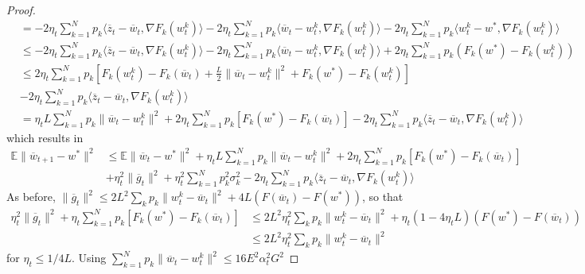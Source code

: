 \begin{proof}
\begin{align*}
	& =-2\eta_{t}\sum_{k=1}^{N}p_{k}\langle\overline{z}_{t}-\overline{w}_{t},\nabla F_{k}(w_{t}^{k})\rangle-2\eta_{t}\sum_{k=1}^{N}p_{k}\langle\overline{w}_{t}-w_{t}^{k},\nabla F_{k}(w_{t}^{k})\rangle-2\eta_{t}\sum_{k=1}^{N}p_{k}\langle w_{t}^{k}-w^{\ast},\nabla F_{k}(w_{t}^{k})\rangle\\
	& \leq-2\eta_{t}\sum_{k=1}^{N}p_{k}\langle\overline{z}_{t}-\overline{w}_{t},\nabla F_{k}(w_{t}^{k})\rangle-2\eta_{t}\sum_{k=1}^{N}p_{k}\langle\overline{w}_{t}-w_{t}^{k},\nabla F_{k}(w_{t}^{k})\rangle+2\eta_{t}\sum_{k=1}^{N}p_{k}(F_{k}(w^{\ast})-F_{k}(w_{t}^{k}))\\
	& \leq2\eta_{t}\sum_{k=1}^{N}p_{k}\left[F_{k}(w_{t}^{k})-F_{k}(\overline{w}_{t})+\frac{L}{2}\|\overline{w}_{t}-w_{t}^{k}\|^{2}+F_{k}(w^{\ast})-F_{k}(w_{t}^{k})\right]\\
	& -2\eta_{t}\sum_{k=1}^{N}p_{k}\langle\overline{z}_{t}-\overline{w}_{t},\nabla F_{k}(w_{t}^{k})\rangle\\
	& =\eta_{t}L\sum_{k=1}^{N}p_{k}\|\overline{w}_{t}-w_{t}^{k}\|^{2}+2\eta_{t}\sum_{k=1}^{N}p_{k}\left[F_{k}(w^{\ast})-F_{k}(\overline{w}_{t})\right]-2\eta_{t}\sum_{k=1}^{N}p_{k}\langle\overline{z}_{t}-\overline{w}_{t},\nabla F_{k}(w_{t}^{k})\rangle
	\end{align*}
	which results in 
	\begin{align*}
	\mathbb{E}\|\overline{w}_{t+1}-w^{\ast}\|^{2} & \leq\mathbb{E}\|\overline{w}_{t}-w^{\ast}\|^{2}+\eta_{t}L\sum_{k=1}^{N}p_{k}\|\overline{w}_{t}-w_{t}^{k}\|^{2}+2\eta_{t}\sum_{k=1}^{N}p_{k}\left[F_{k}(w^{\ast})-F_{k}(\overline{w}_{t})\right]\\
	& +\eta_{t}^{2}\|\overline{g}_{t}\|^{2}+\eta_{t}^{2}\sum_{k=1}^{N}p_{k}^{2}\sigma_{k}^{2}-2\eta_{t}\sum_{k=1}^{N}p_{k}\langle\overline{z}_{t}-\overline{w}_{t},\nabla F_{k}(w_{t}^{k})\rangle
	\end{align*}
	As before, $\|\overline{g}_{t}\|^{2}\leq2L^{2}\sum_{k}p_{k}\|w_{t}^{k}-\overline{w}_{t}\|^{2}+4L(F(\overline{w}_{t})-F(w^{\ast}))$,
	so that 
	\begin{align*}
	\eta_{t}^{2}\|\overline{g}_{t}\|^{2}+\eta_{t}\sum_{k=1}^{N}p_{k}\left[F_{k}(w^{\ast})-F_{k}(\overline{w}_{t})\right] & \leq2L^{2}\eta_{t}^{2}\sum_{k}p_{k}\|w_{t}^{k}-\overline{w}_{t}\|^{2}+\eta_{t}(1-4\eta_{t}L)(F(w^{\ast})-F(\overline{w}_{t}))\\
	& \leq2L^{2}\eta_{t}^{2}\sum_{k}p_{k}\|w_{t}^{k}-\overline{w}_{t}\|^{2}
	\end{align*}
	for $\eta_{t}\le1/4L$. Using $\sum_{k=1}^{N}p_{k}\|\overline{w}_{t}-w_{t}^{k}\|^{2}\leq16E^{2}\alpha_{t}^{2}G^{2}$

\end{proof}

